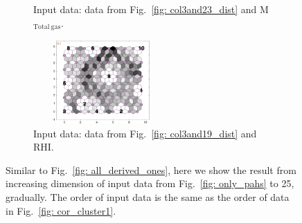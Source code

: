 \begin{figure}
\begin{subfigure}[b]{0.25\textwidth}
        \captionsetup{font=tiny}
        \caption{Input data: data from Fig.~\ref{fig: col3and23_dist} and M$_{\mathrm{ Total\ gas}}$.} 
        \label{fig: col3and24_dist}
    \end{subfigure}
            \hfill
    \begin{subfigure}[b]{0.25\textwidth}
        \centering
        \includegraphics[width=52mm, height=32mm ]{../../images0.01/M31/2D/diff_dimension/combine_2D_data_between_cols3and25.png}
        \captionsetup{font=tiny}
        \caption{Input data: data from Fig.~\ref{fig: col3and19_dist} and RHI.} 
        \label{fig: col3and25_dist}
    \end{subfigure}
    \caption[Increasing dimension of input data from Fig.~\ref{fig: only_pahs} to 25, gradually]{Similar to Fig.~\ref{fig: all_derived_ones}, here we show the result from increasing dimension of input data from Fig.~\ref{fig: only_pahs} to 25, gradually. The order of input data is the same as the order of data in Fig.~\ref{fig: cor_cluster1}.} 
    \label{fig: inc_D_col3s}
\end{figure}